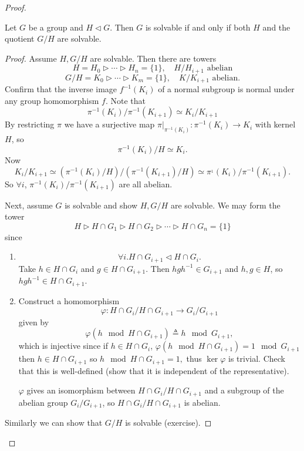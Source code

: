 \begin{proof}

\begin{prop}
Let $G$ be a group and $H \triangleleft G$. Then $G$ is solvable if
and only if both $H$ and the quotient $G / H$ are solvable.
\end{prop}
\begin{proof}
Assume $H, G / H$ are solvable. Then there are towers
$$
H = H_0 \triangleright \cdots \triangleright H_n = \{ 1 \}, \quad
H/H_{i+1} \text{ abelian}
$$
$$
G/H = K_0 \triangleright \cdots \triangleright K_m = \{ 1 \}, \quad
K/K_{i+1} \text{ abelian}.
$$
Confirm that the inverse image $f^{-1}(K_i)$ of a normal subgroup is
normal under any group homomorphism $f$. Note that
$$
\pi^{-1}(K_i) / \pi^{-1}(K_{i+1}) \simeq K_i / K_{i+1}
$$
By restricting $\pi$ we have a surjective map
$\pi|_{\pi^{-1}(K_i)} : \pi^{-1}(K_i) \to K_i$ with kernel $H$,
so
$$
\pi^{-1}(K_i) / H \simeq K_i.
$$
Now
$$
K_i / K_{i+1} \simeq (\pi^{-1}(K_i) / H) / (\pi^{-1}(K_{i+1}) / H)
             \simeq \pi^{_1}(K_i) / \pi^{-1}(K_{i+1}).
$$
So $\forall i$, $\pi^{-1}(K_i) / \pi^{-1}(K_{i+1})$ are all abelian.

Next, assume $G$ is solvable and show $H, G/H$ are solvable.
We may form the tower
$$
H \triangleright H \cap G_1
  \triangleright H \cap G_2
  \triangleright \cdots
  \triangleright H \cap G_n = \{ 1 \}
$$
since
\begin{enumerate}
  \item{
    $$
    \forall i . H \cap G_{i+1} \triangleleft H \cap G_i.
    $$
    Take $h \in H \cap G_i$ and $g \in H \cap G_{i+1}$.
    Then $h g h^{-1} \in G_{i+1}$ and $h, g \in H$, so
    $h g h^{-1} \in H \cap G_{i+1}$.
  }
  \item{
    Construct a homomorphism
    $$
    \varphi : H \cap G_i / H \cap G_{i+1} \to G_i / G_{i+1}
    $$
    given by
    $$
    \varphi(h \mod H \cap G_{i+1}) \triangleq h \mod G_{i+1},
    $$
    which is injective since if $h \in H \cap G_i$,
    $\varphi(h \mod H \cap G_{i+1}) = 1 \mod G_{i+1}$ then
    $h \in H \cap G_{i+1}$ so
    $h \mod H \cap G_{i+1} = 1,$
    thus $\ker \varphi$ is trivial.
    Check that this is well-defined (show that it is independent of
    the representative).

    $\varphi$ gives an isomorphism between
    $H \cap G_i / H \cap G_{i+1}$ and a subgroup of the abelian group
    $G_i / G_{i+1}$, so $H \cap G_i / H \cap G_{i+1}$ is abelian.
  }
\end{enumerate}
Similarly we can show that $G / H$ is solvable (exercise).
\end{proof}


\end{proof}
